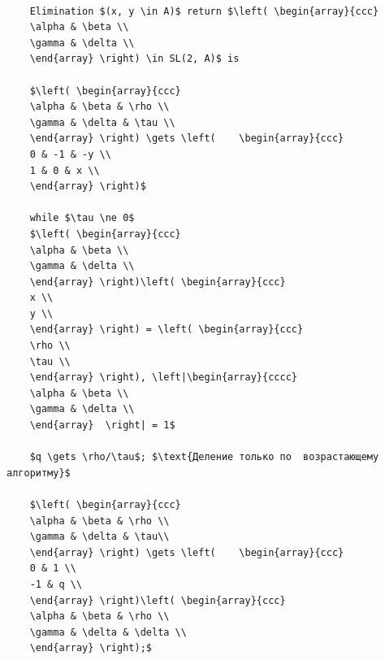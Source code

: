 \begin{lstlisting}[mathescape=true]

    Elimination $(x, y \in A)$ return $\left( \begin{array}{ccc}
    \alpha & \beta \\
    \gamma & \delta \\
    \end{array} \right) \in SL(2, A)$ is

    $\left( \begin{array}{ccc}
    \alpha & \beta & \rho \\
    \gamma & \delta & \tau \\
    \end{array} \right) \gets \left(    \begin{array}{ccc}
    0 & -1 & -y \\
    1 & 0 & x \\
    \end{array} \right)$

    while $\tau \ne 0$ 
    $\left( \begin{array}{ccc}
    \alpha & \beta \\
    \gamma & \delta \\
    \end{array} \right)\left( \begin{array}{ccc}
    x \\
    y \\
    \end{array} \right) = \left( \begin{array}{ccc}
    \rho \\
    \tau \\
    \end{array} \right), \left|\begin{array}{cccc}
    \alpha & \beta \\
    \gamma & \delta \\
    \end{array}  \right| = 1$

    $q \gets \rho/\tau$; $\text{Деление только по  возрастающему алгоритму}$

    $\left( \begin{array}{ccc}
    \alpha & \beta & \rho \\
    \gamma & \delta & \tau\\
    \end{array} \right) \gets \left(    \begin{array}{ccc}
    0 & 1 \\
    -1 & q \\
    \end{array} \right)\left( \begin{array}{ccc}
    \alpha & \beta & \rho \\
    \gamma & \delta & \delta \\
    \end{array} \right);$
    

\end{lstlisting}
